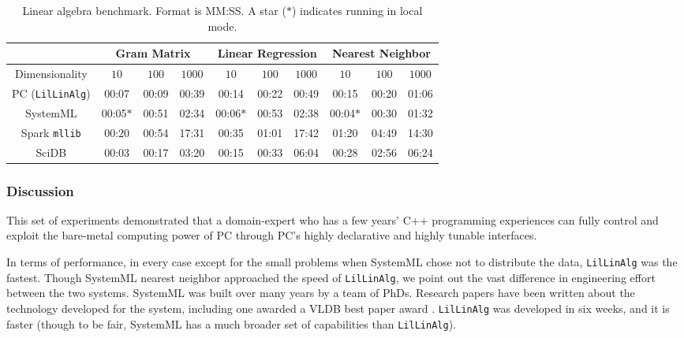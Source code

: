 \begin{table}[h!]
\begin{center}
\begin{tabular}{|c||c|c|c||c|c|c||c|c|c||}
\hline
& \multicolumn{3}{c||}{Gram Matrix} & \multicolumn{3}{c||}{Linear Regression} & \multicolumn{3}{c||}{Nearest Neighbor} \\
\hline
Dimensionality & $10$ & $100$ & $1000$& $10$ & $100$ & $1000$& $10$ & $100$ & $1000$ \\
\hline
\hline
PC (\texttt{LilLinAlg}) &00:07 & 00:09 &00:39 &00:14 &00:22 &00:49& 00:15 & 00:20 & 01:06 \\
SystemML &00:05$*$ &00:51 &02:34 &00:06$*$ &00:53 &02:38 &00:04$*$ &00:30 &01:32 \\
Spark \texttt{mllib} &00:20  &00:54 &17:31 &00:35 &01:01 &17:42 &01:20 & 04:49 &14:30 \\
SciDB   &00:03 &00:17 &03:20 &00:15 &00:33 &06:04 &00:28 &02:56 & 06:24 \\
\hline
\end{tabular}
\caption{Linear algebra benchmark. Format is MM:SS.
A star ($*$) indicates running in local mode.}
\label{fig:LR}
\end{center}
\end{table}

\subsubsection {Discussion}
This set of experiments demonstrated that a
domain-expert who has a few years' C++ programming experiences can fully control and
exploit the bare-metal computing power of PC through PC's highly
declarative and highly tunable interfaces.

In terms of performance, in every case except for the small problems when SystemML chose not to distribute the data,
\texttt{LilLinAlg} was the fastest.  
Though SystemML nearest neighbor approached the speed of 
\texttt{LilLinAlg}, we point out the vast difference in engineering effort between the two systems.  
SystemML was built over many years by a team of PhDs. Research papers have been written about the
technology developed for the system, including one awarded a VLDB best paper award \cite{boehm2016systemml}.
\texttt{LilLinAlg} was developed in six weeks, and it is faster (though to be fair, SystemML has a much broader
set of capabilities than \texttt{LilLinAlg}).

